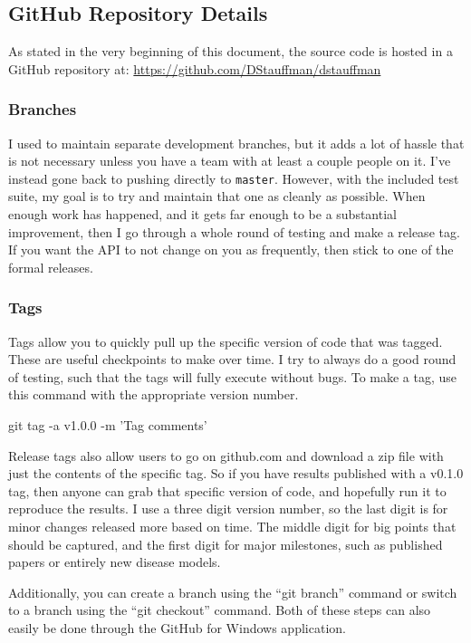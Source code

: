 \documentclass[12pt]{article}
\begin{document}
\subsection{GitHub Repository Details}\label{h2:github_details}
As stated in the very beginning of this document, the source code is hosted in a GitHub repository at:
\url{https://github.com/DStauffman/dstauffman}

\subsubsection{Branches}
I used to maintain separate development branches, but it adds a lot of hassle that is not necessary unless you have a team with at least a couple people on it.  I've instead gone back to pushing directly to \texttt{master}.  However, with the included test suite, my goal is to try and maintain that one as cleanly as possible.  When enough work has happened, and it gets far enough to be a substantial improvement, then I go through a whole round of testing and make a release tag.  If you want the API to not change on you as frequently, then stick to one of the formal releases.

\subsubsection{Tags}
Tags allow you to quickly pull up the specific version of code that was tagged.  These are useful checkpoints to make over time.  I try to always do a good round of testing, such that the tags will fully execute without bugs.  To make a tag, use this command with the appropriate version number.

\begin{PlainText}
git tag -a v1.0.0 -m 'Tag comments'
\end{PlainText}

Release tags also allow users to go on github.com and download a zip file with just the contents of the specific tag.  So if you have results published with a v0.1.0 tag, then anyone can grab that specific version of code, and hopefully run it to reproduce the results.  I use a three digit version number, so the last digit is for minor changes released more based on time.  The middle digit for big points that should be captured, and the first digit for major milestones, such as published papers or entirely new disease models.

Additionally, you can create a branch using the ``git branch'' command or switch to a branch using the ``git checkout'' command.  Both of these steps can also easily be done through the GitHub for Windows application.
\end{document}
